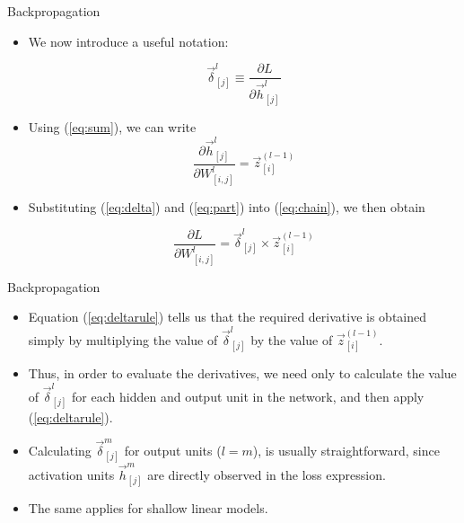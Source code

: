 \documentclass[handout]{beamer}
\begin{document}
\begin{frame}{Backpropagation}
\begin{scriptsize}


\begin{itemize}


\item We now introduce a useful notation:

\begin{equation}
\vec{\delta}_{[j]}^l \equiv \frac{\partial L}{\partial \vec{h}_{[j]}^l}
\label{eq:delta}
\end{equation}

\item Using (\ref{eq:sum}), we can write
\begin{equation}
\frac{\partial \vec{h}_{[j]}^l}{\partial W_{[i,j]}^l} = \vec{z}_{[i]}^{(l-1)}
\label{eq:part}
\end{equation}

\item Substituting (\ref{eq:delta}) and (\ref{eq:part})  into (\ref{eq:chain}), we then obtain

\begin{equation}
\frac{\partial L}{\partial W_{[i,j]}^l} = \vec{\delta}_{[j]}^l \times \vec{z}_{[i]}^{(l-1)}
\label{eq:deltarule}
\end{equation}

\end{itemize}


\end{scriptsize}
\end{frame}


\begin{frame}{Backpropagation}
\begin{scriptsize}

\begin{itemize}
 \item  Equation (\ref{eq:deltarule}) tells us that the required derivative is obtained simply by multiplying the value of $\vec{\delta}_{[j]}^l$ by the value of $\vec{z}_{[i]}^{(l-1)}$.
 
 \item Thus, in order to evaluate the derivatives, we need only to calculate the value of $\vec{\delta}_{[j]}^l$ for each hidden and output unit in the network, and then apply (\ref{eq:deltarule}).
 
 \item Calculating $\vec{\delta}_{[j]}^m$ for output units ($l=m$), is usually straightforward, since activation units $\vec{h}_{[j]}^m$ are directly observed in the loss expression.
 
 \item The same applies for shallow linear models.
\end{itemize} 
\end{scriptsize}
\end{frame}
\end{document}
